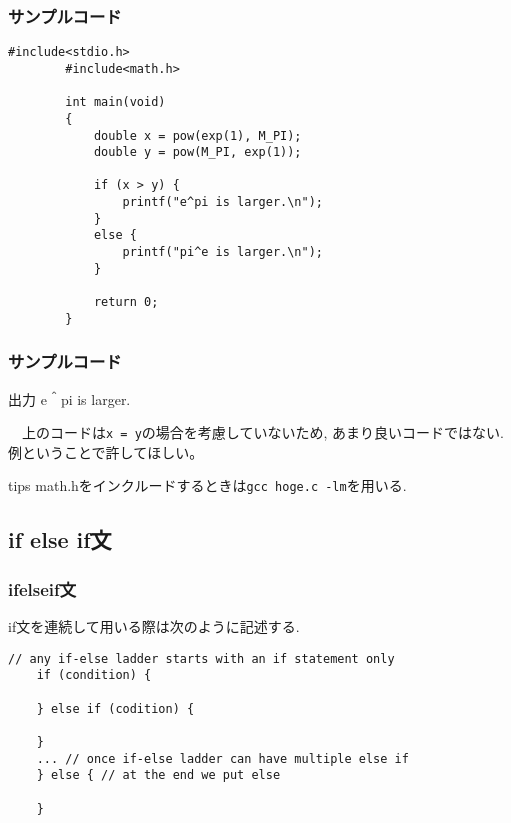 \documentclass[dvipdfmx]{beamer}
\begin{document}
\begin{frame}[t, fragile, label=34]
    \frametitle{サンプルコード}
    \begin{lstlisting}[gobble=8, caption=pra\_if.c, label=pra-if]
        #include<stdio.h>
        #include<math.h>

        int main(void)
        {
            double x = pow(exp(1), M_PI);
            double y = pow(M_PI, exp(1));
        
            if (x > y) {
                printf("e^pi is larger.\n");
            }
            else {
                printf("pi^e is larger.\n");
            }

            return 0;
        }
    \end{lstlisting}
    \vfill \hfill 
    \hyperlink{33}{}
    \space
    \hyperlink{35}{}
\end{frame}

\begin{frame}[label=35]
    \frametitle{サンプルコード}
    \begin{block}{出力}
        e＾pi is larger.
    \end{block}
    　上のコードは\texttt{x = y}の場合を考慮していないため,
    あまり良いコードではない.例ということで許してほしい。
    \begin{itembox}[l]{tips}
    math.hをインクルードするときは\texttt{gcc hoge.c -lm}を用いる.
    \end{itembox}
    \vfill \hfill 
    \hyperlink{34}{}
    \space
    \hyperlink{36}{}
\end{frame}

\subsection{if else if文}
\begin{frame}[t, fragile, label=36]
    \frametitle{if\space else\space if文}
    if文を連続して用いる際は次のように記述する.
    \begin{lstlisting}[gobble=3, caption=Syntax\space of\space if-else-if, label=if_howto]
    // any if-else ladder starts with an if statement only
    if (condition) {
    
    } else if (codition) {
    
    }
    ... // once if-else ladder can have multiple else if
    } else { // at the end we put else

    }
    \end{lstlisting}
    \vfill \hfill 
    \hyperlink{35}{}
    \space
    \hyperlink{37}{}
\end{frame}
\end{document}
